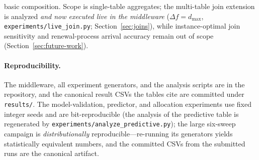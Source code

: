 \documentclass[sigconf,nonacm]{acmart}
\begin{document}
basic composition. Scope is single-table aggregates; the multi-table join extension is analyzed \emph{and now executed live in the middleware} ($\Delta f{=}d_{\max}$, \texttt{experiments/live\_join.py}; Section~\ref{sec:joins}), while instance-optimal join sensitivity and renewal-process arrival accuracy remain out of scope (Section~\ref{sec:future-work}).

\paragraph{Reproducibility.} The middleware, all experiment generators, and the analysis scripts are in the repository, and the canonical result CSVs the tables cite are committed under \texttt{results/}. The model-validation, predictor, and allocation experiments use fixed integer seeds and are bit-reproducible (the analysis of the predictive table is regenerated by \texttt{experiments/analyze\_predictive.py}); the large six-sweep campaign is \emph{distributionally} reproducible---re-running its generators yields statistically equivalent numbers, and the committed CSVs from the submitted runs are the canonical artifact.
\end{document}
